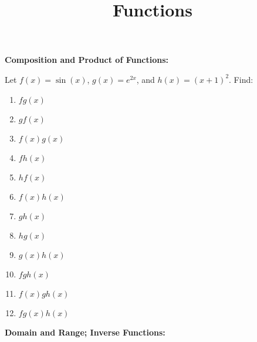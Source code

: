 \documentclass{article}
\begin{document}
\title{Functions}
\date{}

\maketitle
\thispagestyle{empty}

\Large





\textbf{Composition and Product of Functions:}

\vspace{5mm}

Let $f(x)=\sin(x)$, $g(x)=e^{2x}$, and $h(x)=(x+1)^2$. Find:

\begin{enumerate}
	\item $fg(x)$
	\item $gf(x)$
	\item $f(x)g(x)$
	\item $fh(x)$
	\item $hf(x)$
	\item $f(x)h(x)$
	\item $gh(x)$
	\item $hg(x)$
	\item $g(x)h(x)$
	\item $fgh(x)$
	\item $f(x)gh(x)$
	\item $fg(x)h(x)$
\end{enumerate}



\clearpage



\textbf{Domain and Range; Inverse Functions:}

\vspace{5mm}
\end{document}
